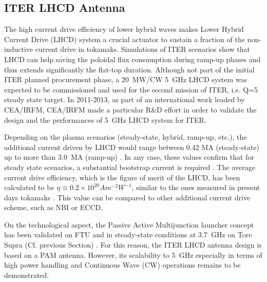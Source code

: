\subsection{ITER LHCD Antenna}\label{sec:ITER_LHCD_antenna}
The high current drive efficiency of lower hybrid waves makes Lower Hybrid Current Drive (LHCD) system a crucial actuator to sustain a fraction of the non-inductive current drive in tokamaks. Simulations of ITER scenarios show that LHCD can help saving the poloidal flux consumption during ramp-up phases and thus extends significantly the flat-top duration. Although not part of the initial ITER planned procurement phase, a 20~MW/CW 5~GHz LHCD system was expected to be commissioned and used for the second mission of ITER, i.e. Q=5 steady state target. In 2011-2013, as part of an international work leaded by CEA/IRFM, CEA/IRFM made a particular R\&D effort in order to validate the design and the performances of 5~\si{GHz} LHCD system for ITER. 

Depending on the plasma scenarios (steady-state, hybrid, ramp-up, etc.), the additional current driven by LHCD would range between 0.42 MA (steady-state) up to more than 3.0~MA (ramp-up) . In any case, these values confirm that for steady state scenarios, a substantial bootstrap current is required . The average current drive efficiency, which is the figure of merit of the LHCD, has been calculated to be $\eta \equiv 0.2 \times 10^{20} \si{A m^{-2} W^{-1}}$, similar to the ones measured in present days tokamaks . This value  can be compared to other additional current drive scheme, such as NBI or ECCD. 

On the technological aspect, the Passive Active Multijunction launcher concept has been validated on FTU and in steady-state conditions at 3.7~\si{GHz} on Tore Supra (Cf. previous Section) . For this reason, the ITER LHCD antenna design is based on a PAM antenna. However, its scalability to 5~\si{GHz} especially in terms of high power handling and Continuous Wave (CW) operations remains to be demonstrated. 

